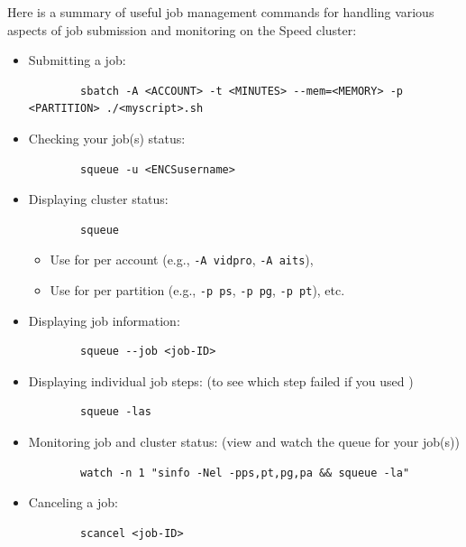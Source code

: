 Here is a summary of useful job management commands for handling various aspects of 
job submission and monitoring on the Speed cluster:

\begin{itemize}
	\item Submitting a job:
	\small
	\begin{verbatim}
		sbatch -A <ACCOUNT> -t <MINUTES> --mem=<MEMORY> -p <PARTITION> ./<myscript>.sh
	\end{verbatim}
	\normalsize

	\item Checking your job(s) status:
	\small
	\begin{verbatim}
		squeue -u <ENCSusername>
	\end{verbatim}
	\normalsize

	\item Displaying cluster status:
	\small
	\begin{verbatim}
		squeue
	\end{verbatim}
	\normalsize
		\begin{itemize}
			\item Use  for per account (e.g., \texttt{-A vidpro}, \texttt{-A aits}), 
			\item Use  for per partition (e.g., \texttt{-p ps}, \texttt{-p pg}, \texttt{-p pt}), etc.
		\end{itemize}

	\item Displaying job information:
	\small
	\begin{verbatim}
		squeue --job <job-ID>
	\end{verbatim}
	\normalsize

	\item Displaying individual job steps: (to see which step failed if you used )
	\small
	\begin{verbatim}
		squeue -las
	\end{verbatim}
	\normalsize

	\item Monitoring job and cluster status: (view  and watch the queue for your job(s))
	\small
	\begin{verbatim}
		watch -n 1 "sinfo -Nel -pps,pt,pg,pa && squeue -la"
	\end{verbatim}
	\normalsize

	\item Canceling a job:
	\small
	\begin{verbatim}
		scancel <job-ID>
	\end{verbatim}
	\normalsize


\end{itemize}
